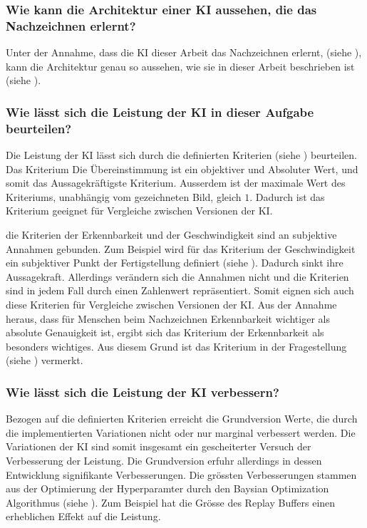\subsubsection*{Wie kann die Architektur einer KI aussehen, die das Nachzeichnen erlernt?}\label{subsub:d_frage_unter_1}
Unter der Annahme, dass die KI dieser Arbeit das Nachzeichnen erlernt, (siehe
), kann die Architektur genau so aussehen, wie sie in
dieser Arbeit beschrieben ist (siehe ).

\subsubsection*{Wie lässt sich die Leistung der KI in dieser Aufgabe beurteilen?}\label{subsub:d_frage_unter_2}
Die Leistung der KI lässt sich durch die definierten Kriterien (siehe
) beurteilen. Das Kriterium Die Übereinstimmung ist ein
objektiver und Absoluter Wert, und somit das Aussagekräftigste Kriterium.
Ausserdem ist der maximale Wert des Kriteriums, unabhängig vom gezeichneten
Bild, gleich $1$. Dadurch ist das Kriterium geeignet für Vergleiche zwischen
Versionen der KI.

die Kriterien der Erkennbarkeit und der Geschwindigkeit sind an subjektive
Annahmen gebunden. Zum Beispiel wird für das Kriterium der Geschwindigkeit ein
subjektiver Punkt der Fertigstellung definiert (siehe
). Dadurch sinkt ihre Aussagekraft. Allerdings
verändern sich die Annahmen nicht und die Kriterien sind in jedem Fall durch
einen Zahlenwert repräsentiert. Somit eignen sich auch diese Kriterien für
Vergleiche zwischen Versionen der KI. Aus der Annahme heraus, dass für Menschen
beim Nachzeichnen Erkennbarkeit wichtiger als absolute Genauigkeit ist, ergibt
sich das Kriterium der Erkennbarkeit als besonders wichtiges. Aus diesem Grund
ist das Kriterium in der Fragestellung (siehe )
vermerkt.


\subsubsection*{Wie lässt sich die Leistung der KI verbessern?}\label{subsub:d_frage_unter_3}
Bezogen auf die definierten Kriterien erreicht die Grundversion Werte, die durch
die implementierten Variationen nicht oder nur marginal verbessert werden. Die
Variationen der KI sind somit insgesamt ein gescheiterter Versuch der
Verbesserung der Leistung. Die Grundversion erfuhr allerdings in dessen
Entwicklung signifikante Verbesserungen. Die grössten Verbesserungen stammen aus
der Optimierung der Hyperparamter durch den Baysian Optimization Algorithmus
(siehe ). Zum Beispiel hat die Grösse des Replay
Buffers einen erheblichen Effekt auf die Leistung.

